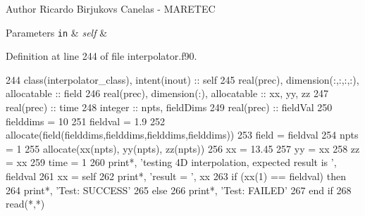 \begin{DoxyAuthor}{Author}
Ricardo Birjukovs Canelas -\/ M\+A\+R\+E\+T\+EC 
\end{DoxyAuthor}

\begin{DoxyParams}[1]{Parameters}
\mbox{\tt in}  & {\em self} & \\
\hline
\end{DoxyParams}


Definition at line 244 of file interpolator.\+f90.


\begin{DoxyCode}
244     \textcolor{keywordtype}{class}(interpolator\_class), \textcolor{keywordtype}{intent(inout)} :: self
245     \textcolor{keywordtype}{real(prec)}, \textcolor{keywordtype}{dimension(:,:,:,:)}, \textcolor{keywordtype}{allocatable} :: field
246     \textcolor{keywordtype}{real(prec)}, \textcolor{keywordtype}{dimension(:)}, \textcolor{keywordtype}{allocatable} :: xx, yy, zz 
247     \textcolor{keywordtype}{real(prec)} :: time
248     \textcolor{keywordtype}{integer} :: npts, fieldDims
249     \textcolor{keywordtype}{real(prec)} :: fieldVal
250     fielddims = 10
251     fieldval = 1.9
252     \textcolor{keyword}{allocate}(field(fielddims,fielddims,fielddims,fielddims))
253     field = fieldval
254     npts = 1 
255     \textcolor{keyword}{allocate}(xx(npts), yy(npts), zz(npts))
256     xx = 13.45
257     yy = xx
258     zz = xx
259     time = 1
260     print*, \textcolor{stringliteral}{'testing 4D interpolation, expected result is '}, fieldval
261     xx = self%
262     print*, \textcolor{stringliteral}{'result = '}, xx
263     \textcolor{keywordflow}{if} (xx(1) == fieldval) \textcolor{keywordflow}{then} 
264         print*, \textcolor{stringliteral}{'Test: SUCCESS'}
265     \textcolor{keywordflow}{else}
266         print*, \textcolor{stringliteral}{'Test: FAILED'}
267 \textcolor{keywordflow}{    end if}
268     \textcolor{keyword}{read}(*,*)
\end{DoxyCode}

